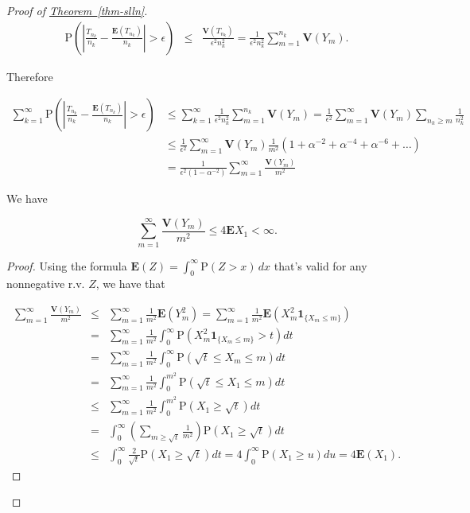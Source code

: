 \begin{proof}[Proof of \texorpdfstring{\hyperref[thm-slln]{Theorem~\ref*{thm-slln}}}{Theorem}]
\begin{eqnarray*}
\mathrm{P}\left(\left|\frac{T_{n_k}}{n_k} - \frac{\mathbf{E}(T_{n_k})}{n_k}\right| > \epsilon\right)
&\le&
\frac{\mathbf{V}(T_{n_k})}{\epsilon^2 n_k^2}
= \frac{1}{\epsilon^2 n_k^2} \sum_{m=1}^{n_k} \mathbf{V}(Y_m).
\end{eqnarray*}

\noindent Therefore

\begin{align*}
\sum_{k=1}^\infty
\mathrm{P}\left(\left|\frac{T_{n_k}}{n_k} - \frac{\mathbf{E}(T_{n_k})}{n_k}\right| > \epsilon\right)
&\le
\sum_{k=1}^\infty  \frac{1}{\epsilon^2 n_k^2} \sum_{m=1}^{n_k} \mathbf{V}(Y_m)
= \frac{1}{\epsilon^2} \sum_{m=1}^\infty \mathbf{V}(Y_m) \sum_{n_k\ge m} \frac{1}{n_k^2}
\\
&\le
\frac{1}{\epsilon^2} \sum_{m=1}^\infty \mathbf{V}(Y_m) \frac{1}{m^2}(1+\alpha^{-2}+\alpha^{-4}+\alpha^{-6}+\ldots)
\\
&=
\tag{9}\label{eq:infinitesum}
\frac{1}{\epsilon^2(1-\alpha^{-2})} \sum_{m=1}^\infty  \frac{\mathbf{V}(Y_m)}{m^2}
\end{align*}

\begin{lem}
We have

\[
\sum_{m=1}^\infty \frac{\mathbf{V}(Y_m)}{m^2} \le 4 \mathbf{E} X_1 < \infty.
\]

\end{lem}

\begin{proof}
Using the formula
$\mathbf{E}(Z)=\int_0^\infty \mathrm{P}(Z>x)\,dx$
that's valid for any nonnegative r.v. $Z$, we have
that

\begin{eqnarray*}
\sum_{m=1}^\infty \frac{\mathbf{V}(Y_m)}{m^2} &\le& \sum_{m=1}^\infty \frac{1}{m^2} \mathbf{E}(Y_m^2)
=\sum_{m=1}^\infty \frac{1}{m^2}\mathbf{E}\left(X_m^2 \mathbf{1}_{\{X_m\le m\}}\right) \\
&=& \sum_{m=1}^\infty \frac{1}{m^2} \int_0^\infty \mathrm{P}\left(X_m^2 \mathbf{1}_{\{X_m\le m\}}>t\right)dt \\
&=& \sum_{m=1}^\infty \frac{1}{m^2} \int_0^\infty \mathrm{P}\left(\sqrt{t} \le X_m \le m \right)dt \\
&=& \sum_{m=1}^\infty \frac{1}{m^2} \int_0^{m^2} \mathrm{P}\left(\sqrt{t} \le X_1 \le m \right)dt \\
&\le& \sum_{m=1}^\infty \frac{1}{m^2} \int_0^{m^2} \mathrm{P}\left(X_1 \ge \sqrt{t} \right)dt \\
&=& \int_0^\infty \left(\sum_{m\ge \sqrt{t}} \frac{1}{m^2}\right) \mathrm{P}\left(X_1\ge \sqrt{t}\right)dt \\
&\le& \int_0^\infty \frac{2}{\sqrt{t}} \mathrm{P}\left(X_1\ge \sqrt{t}\right)dt = 4 \int_0^\infty \mathrm{P}(X_1\ge u)du = 4\mathbf{E}(X_1).
\end{eqnarray*}


\end{proof}
\end{proof}
